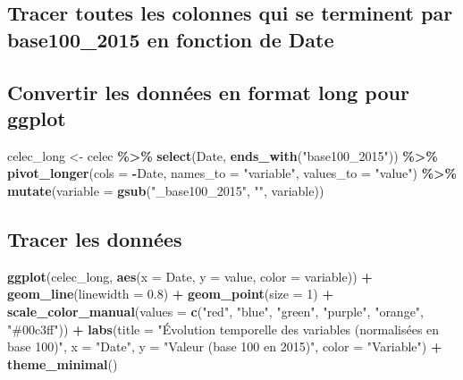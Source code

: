 \documentclass[
]{article}
\newenvironment{Shaded}{\begin{snugshade}}{\end{snugshade}}
\newcommand{\AttributeTok}[1]{\textcolor[rgb]{0.13,0.29,0.53}{#1}}
\newcommand{\DecValTok}[1]{\textcolor[rgb]{0.00,0.00,0.81}{#1}}
\newcommand{\FloatTok}[1]{\textcolor[rgb]{0.00,0.00,0.81}{#1}}
\newcommand{\FunctionTok}[1]{\textcolor[rgb]{0.13,0.29,0.53}{\textbf{#1}}}
\newcommand{\NormalTok}[1]{#1}
\newcommand{\OtherTok}[1]{\textcolor[rgb]{0.56,0.35,0.01}{#1}}
\newcommand{\SpecialCharTok}[1]{\textcolor[rgb]{0.81,0.36,0.00}{\textbf{#1}}}
\newcommand{\StringTok}[1]{\textcolor[rgb]{0.31,0.60,0.02}{#1}}
\begin{document}
\subsection{Tracer toutes les colonnes qui se terminent par
base100\_2015 en fonction de
Date}\label{tracer-toutes-les-colonnes-qui-se-terminent-par-base100_2015-en-fonction-de-date}

\subsection{Convertir les données en format long pour
ggplot}\label{convertir-les-donnuxe9es-en-format-long-pour-ggplot}

\begin{Shaded}
\begin{Highlighting}[]
\NormalTok{celec\_long }\OtherTok{\textless{}{-}}\NormalTok{ celec }\SpecialCharTok{\%\textgreater{}\%}
    \FunctionTok{select}\NormalTok{(Date, }\FunctionTok{ends\_with}\NormalTok{(}\StringTok{"base100\_2015"}\NormalTok{)) }\SpecialCharTok{\%\textgreater{}\%}
    \FunctionTok{pivot\_longer}\NormalTok{(}\AttributeTok{cols =} \SpecialCharTok{{-}}\NormalTok{Date, }\AttributeTok{names\_to =} \StringTok{"variable"}\NormalTok{, }\AttributeTok{values\_to =} \StringTok{"value"}\NormalTok{) }\SpecialCharTok{\%\textgreater{}\%}
    \FunctionTok{mutate}\NormalTok{(}\AttributeTok{variable =} \FunctionTok{gsub}\NormalTok{(}\StringTok{"\_base100\_2015"}\NormalTok{, }\StringTok{""}\NormalTok{, variable))}
\end{Highlighting}
\end{Shaded}

\subsection{Tracer les données}\label{tracer-les-donnuxe9es}

\begin{Shaded}
\begin{Highlighting}[]
\FunctionTok{ggplot}\NormalTok{(celec\_long, }\FunctionTok{aes}\NormalTok{(}\AttributeTok{x =}\NormalTok{ Date, }\AttributeTok{y =}\NormalTok{ value, }\AttributeTok{color =}\NormalTok{ variable)) }\SpecialCharTok{+}
    \FunctionTok{geom\_line}\NormalTok{(}\AttributeTok{linewidth =} \FloatTok{0.8}\NormalTok{) }\SpecialCharTok{+}
    \FunctionTok{geom\_point}\NormalTok{(}\AttributeTok{size =} \DecValTok{1}\NormalTok{) }\SpecialCharTok{+}
    \FunctionTok{scale\_color\_manual}\NormalTok{(}\AttributeTok{values =} \FunctionTok{c}\NormalTok{(}\StringTok{"red"}\NormalTok{, }\StringTok{"blue"}\NormalTok{, }\StringTok{"green"}\NormalTok{, }\StringTok{"purple"}\NormalTok{, }\StringTok{"orange"}\NormalTok{, }\StringTok{"\#00c3ff"}\NormalTok{)) }\SpecialCharTok{+}
    \FunctionTok{labs}\NormalTok{(}\AttributeTok{title =} \StringTok{"Évolution temporelle des variables (normalisées en base 100)"}\NormalTok{,}
       \AttributeTok{x =} \StringTok{"Date"}\NormalTok{,}
       \AttributeTok{y =} \StringTok{"Valeur (base 100 en 2015)"}\NormalTok{,}
       \AttributeTok{color =} \StringTok{"Variable"}\NormalTok{) }\SpecialCharTok{+}
    \FunctionTok{theme\_minimal}\NormalTok{()}
\end{Highlighting}
\end{Shaded}
\end{document}
